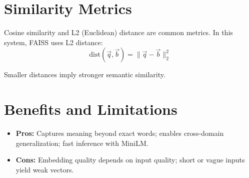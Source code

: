 \section*{Similarity Metrics}
Cosine similarity and L2 (Euclidean) distance are common metrics. In this system, FAISS uses L2 distance:
\[ \text{dist}(\vec{q}, \vec{b}) = \| \vec{q} - \vec{b} \|_2^2 \]

Smaller distances imply stronger semantic similarity.

\section*{Benefits and Limitations}
\begin{itemize}
  \item \textbf{Pros:} Captures meaning beyond exact words; enables cross-domain generalization; fast inference with MiniLM.
  \item \textbf{Cons:} Embedding quality depends on input quality; short or vague inputs yield weak vectors.
\end{itemize}
